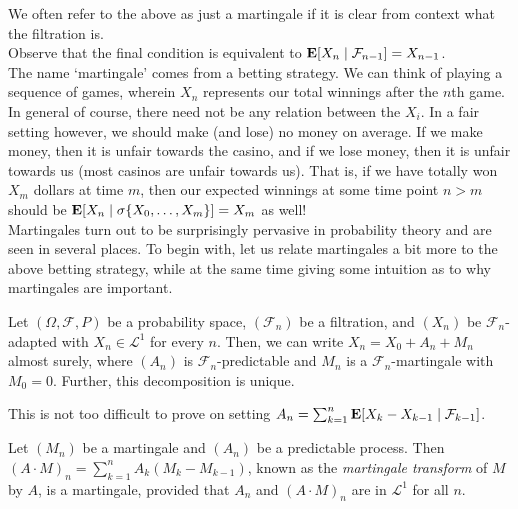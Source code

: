 We often refer to the above as just a martingale if it is clear from context what the filtration is.\\
Observe that the final condition is equivalent to $\textbf{E}[X_n\mid\mathcal{F}_{n-1}] = X_{n-1}$.\\
The name `martingale' comes from a betting strategy. We can think of playing a sequence of games, wherein $X_n$ represents our total winnings after the $n$th game. In general of course, there need not be any relation between the $X_i$. In a fair setting however, we should make (and lose) no money on average. If we make money, then it is unfair towards the casino, and if we lose money, then it is unfair towards us (most casinos are unfair towards us). That is, if we have totally won $X_m$ dollars at time $m$, then our expected winnings at some time point $n>m$ should be $\textbf{E}[X_n \mid \sigma\{X_0,\ldots,X_m\}] = X_m$ as well!\\
Martingales turn out to be surprisingly pervasive in probability theory and are seen in several places. To begin with, let us relate martingales a bit more to the above betting strategy, while at the same time giving some intuition as to why martingales are important.

\begin{lemma}
	\label{doob decomposition}
	Let $(\Omega,\mathcal{F},P)$ be a probability space, $(\mathcal{F}_n)$ be a filtration, and $(X_n)$ be $\mathcal{F}_n$-adapted with $X_n\in\mathcal{L}^1$ for every $n$. Then, we can write $X_n = X_0 + A_n + M_n$ almost surely, where $(A_n)$ is $\mathcal{F}_n$-predictable and $M_n$ is a $\mathcal{F}_n$-martingale with $M_0=0$. Further, this decomposition is unique.
\end{lemma}

This is not too difficult to prove on setting $A_n = \sum_{k=1}^n \textbf{E}[X_k - X_{k-1} \mid \mathcal{F}_{k-1}]$.

\begin{definition}
	Let $(M_n)$ be a martingale and $(A_n)$ be a predictable process. Then $(A\cdot M)_n = \sum_{k=1}^n A_k (M_k - M_{k-1})$, known as the \textit{martingale transform} of $M$ by $A$, is a martingale, provided that $A_n$ and $(A\cdot M)_n$ are in $\mathcal{L}^1$ for all $n$.
\end{definition}

